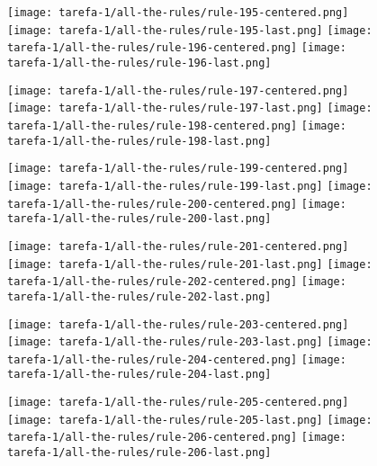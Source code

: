 \begin{figure}[htbp]
  \centering
\texttt{[image: tarefa-1/all-the-rules/rule-195-centered.png]}
\texttt{[image: tarefa-1/all-the-rules/rule-195-last.png]}
\texttt{[image: tarefa-1/all-the-rules/rule-196-centered.png]}
\texttt{[image: tarefa-1/all-the-rules/rule-196-last.png]}
\end{figure}
\begin{figure}[htbp]
  \centering
\texttt{[image: tarefa-1/all-the-rules/rule-197-centered.png]}
\texttt{[image: tarefa-1/all-the-rules/rule-197-last.png]}
\texttt{[image: tarefa-1/all-the-rules/rule-198-centered.png]}
\texttt{[image: tarefa-1/all-the-rules/rule-198-last.png]}
\end{figure}
\begin{figure}[htbp]
  \centering
\texttt{[image: tarefa-1/all-the-rules/rule-199-centered.png]}
\texttt{[image: tarefa-1/all-the-rules/rule-199-last.png]}
\texttt{[image: tarefa-1/all-the-rules/rule-200-centered.png]}
\texttt{[image: tarefa-1/all-the-rules/rule-200-last.png]}
\end{figure}
\begin{figure}[htbp]
  \centering
\texttt{[image: tarefa-1/all-the-rules/rule-201-centered.png]}
\texttt{[image: tarefa-1/all-the-rules/rule-201-last.png]}
\texttt{[image: tarefa-1/all-the-rules/rule-202-centered.png]}
\texttt{[image: tarefa-1/all-the-rules/rule-202-last.png]}
\end{figure}
\begin{figure}[htbp]
  \centering
\texttt{[image: tarefa-1/all-the-rules/rule-203-centered.png]}
\texttt{[image: tarefa-1/all-the-rules/rule-203-last.png]}
\texttt{[image: tarefa-1/all-the-rules/rule-204-centered.png]}
\texttt{[image: tarefa-1/all-the-rules/rule-204-last.png]}
\end{figure}
\begin{figure}[htbp]
  \centering
\texttt{[image: tarefa-1/all-the-rules/rule-205-centered.png]}
\texttt{[image: tarefa-1/all-the-rules/rule-205-last.png]}
\texttt{[image: tarefa-1/all-the-rules/rule-206-centered.png]}
\texttt{[image: tarefa-1/all-the-rules/rule-206-last.png]}
\end{figure}
